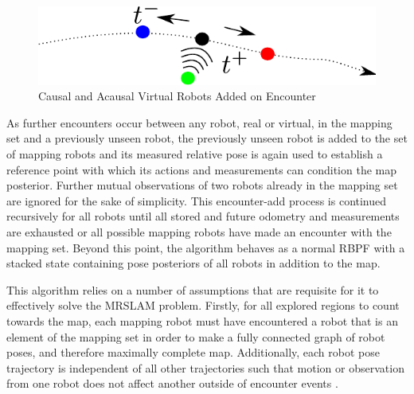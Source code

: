 \begin{figure}[ht]
\centering
\includegraphics[width=\columnwidth]{../FinalFigures/ForwardBackward.pdf}
\caption{Causal and Acausal Virtual Robots Added on Encounter}
\label{fig:forwardbackward}
\end{figure}
As further encounters occur between any robot, real or virtual, in the mapping set and a previously unseen robot, the previously unseen robot is added to the set of mapping robots and its measured relative pose is again used to establish a reference point with which its actions and measurements can condition the map posterior. Further mutual observations of two robots already in the mapping set are ignored for the sake of simplicity. This encounter-add process is continued recursively for all robots until all stored and future odometry and measurements are exhausted or all possible mapping robots have made an encounter with the mapping set. Beyond this point, the algorithm behaves as a normal RBPF with a stacked state containing pose posteriors of all robots in addition to the map.


This algorithm relies on a number of assumptions that are requisite for it to effectively solve the MRSLAM problem. Firstly, for all explored regions to count towards the map, each mapping robot must have encountered a robot that is an element of the mapping set in order to make a fully connected graph of robot poses, and therefore maximally complete map. Additionally, each robot pose trajectory is independent of all other trajectories such that motion or observation from one robot does not affect another outside of encounter events \cite{howard2006multi}.

